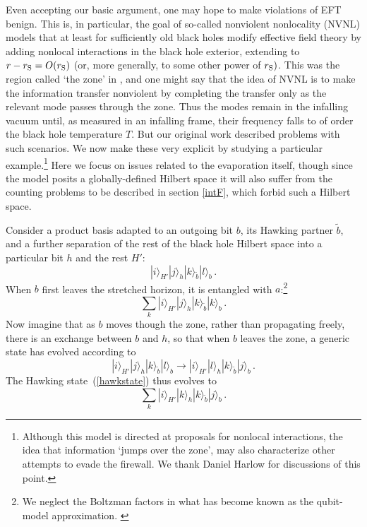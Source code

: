 \documentclass[12pt]{article}
\newcommand{\be}{\begin{equation}}
\newcommand{\ee}{\end{equation}}
\begin{document}
Even accepting our basic argument, one may hope to make violations of EFT benign.  This is, in particular, the goal of so-called nonviolent nonlocality (NVNL) models \cite{Giddings:2011ks,Giddings:2012gc,Giddings:2013kcj} that {at least for sufficiently old black holes} modify effective field theory by adding nonlocal interactions in the black hole exterior, {extending to $r - r_{\rm S} = O(r_{\rm S})$ (or, more generally, to some other power of $r_{\rm S})$. This was the region called `the zone' in \cite{Bousso:2012as,Susskind:2012rm}, and one might say that the idea of NVNL is to make the information transfer nonviolent by completing the transfer only as the relevant mode passes through the zone. Thus the modes remain} in the infalling vacuum until, as measured in an infalling frame, their frequency falls to of order the black hole temperature $T$.   But our original work \cite{Almheiri:2012rt} described problems with such scenarios.  We now make these very explicit by studying a particular example.\footnote{{Although this model is directed at proposals for nonlocal interactions, the idea that information  `jumps over the zone',  may also characterize other attempts to evade the firewall.  We thank Daniel Harlow for discussions of this point.}} Here we focus on issues related to the evaporation itself, though since the model posits a globally-defined Hilbert space it will also suffer from the counting problems to be described in section \ref{intF}, which forbid such a Hilbert space.


Consider a product basis {adapted to} an outgoing bit $b$, its Hawking partner $\tilde b$, and {a further separation of} the rest of the black hole Hilbert space into a particular bit $h$ and the rest $H'$:
\be
|i\rangle_{H'} |j\rangle_{h} |k\rangle_{\tilde b} |l\rangle_{b} \,.
\ee
When $b$ first leaves the stretched horizon, it is entangled with $a$:\footnote{We neglect the Boltzman factors in what has become known as the qubit-model approximation. \label{qubit}}
\be
\sum_k  |i\rangle_{H'} |j\rangle_{h} |k\rangle_{\tilde b} |k\rangle_{b} \,. \label{hawkstate}
\ee
Now imagine that as $b$ moves though the {zone}, rather than propagating freely, there is an exchange between $b$ and $h$, so that when $b$ leaves the {zone}, a generic state has evolved according to
\be
\label{ti}
|i\rangle_{H'} |j\rangle_{h} |k\rangle_{\tilde b} |l\rangle_{b}
\to
|i\rangle_{H'} |l\rangle_{h} |k\rangle_{\tilde b} |j\rangle_{b} \,.
\ee
The Hawking state~(\ref{hawkstate}) thus evolves to
\be
\sum_k  |i\rangle_{H'} |k\rangle_{h} |k\rangle_{\tilde b} |j\rangle_{b} \,. \label{leavezone}
\ee
\end{document}
